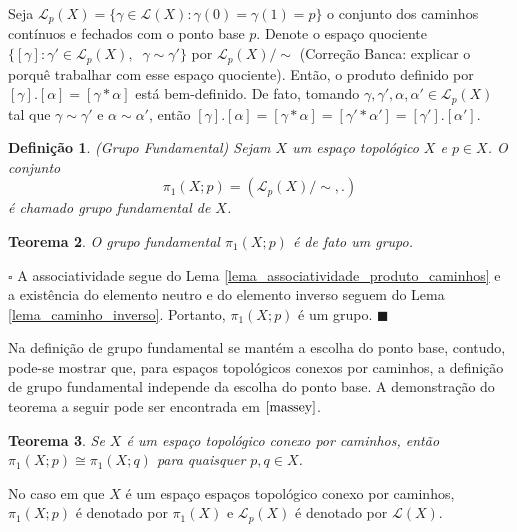 \documentclass[12pt]{book}
\newtheorem{teorema}{Teorema}[section]
\newtheorem{definicao}[teorema]{Definição}
\newenvironment{prova}[1]{$\square$ #1}{\hfill$\blacksquare$}
\newcommand{\caminhos}{\mathcal{L}}
\newcommand{\caminhospontobase}[1]{\caminhos_{#1}}
\newcommand{\caminhossempontobase}[1]{\caminhos(#1)}
\newcommand{\caminhospontobasegeral}[2]{\caminhos_{#1}(#2)}
\newcommand{\classe}[1]{[#1]}
\newcommand{\grupofundamental}[1]{\pi_{1}(#1)}
\newcommand{\grupofundamentalpontobase}[2]{\pi_{1}(#1; #2)}
\newcommand{\alerta}[1]{{\color{red}#1}}
\newcommand{\correcaobanca}[1]{\alerta{(Correção Banca: #1)}}
\begin{document}
	Seja $\caminhospontobasegeral{p}{X} = \{\gamma\in \caminhossempontobase{X}: \gamma(0)=\gamma(1)=p \}$ o conjunto dos caminhos contínuos e fechados com o ponto base $p$. Denote o espaço quociente $\{ \classe{\gamma} : \gamma' \in \caminhospontobasegeral{p}{X},\;\;\gamma \sim \gamma'\}$ por $\caminhospontobasegeral{p}{X}/\sim $ \correcaobanca{explicar o porquê trabalhar com esse espaço quociente}. Então, o produto definido por $\classe{\gamma}.\classe{\alpha} = \classe{\gamma*\alpha}$ está bem-definido. De fato, tomando $\gamma, \gamma',\alpha, \alpha' \in \caminhospontobasegeral{p}{X}$ tal que $\gamma \sim \gamma'$ e $\alpha \sim \alpha'$, então $\classe{\gamma}.\classe{\alpha} = \classe{\gamma*\alpha} = \classe{\gamma'*\alpha'} = \classe{\gamma'}.\classe{\alpha'}$.
	
	
	\begin{definicao}
		(Grupo Fundamental) Sejam $X$ um espaço topológico $X$ e $p\in X$. O conjunto
		$$
		\grupofundamentalpontobase{X}{p} = (\caminhospontobase{p}(X)/\sim, .)
		$$
		é chamado grupo fundamental de $X$.
	\end{definicao}
	
	\begin{teorema}
		O grupo fundamental $\grupofundamentalpontobase{X}{p}$ é de fato um grupo.
	\end{teorema}
	\begin{prova}
	A associatividade segue do Lema \ref{lema_associatividade_produto_caminhos} e a existência do elemento neutro e do elemento inverso  seguem do Lema \ref{lema_caminho_inverso}. Portanto, $\grupofundamentalpontobase{X}{p}$ é um grupo. 
	\end{prova}
	
	Na definição de grupo fundamental se mantém a escolha do ponto base, contudo, pode-se mostrar que, para espaços topológicos conexos por caminhos, a definição de grupo fundamental independe da escolha do ponto base. A demonstração do teorema a seguir pode ser encontrada em $\cite{massey}$.
	
	\begin{teorema}
		Se $X$ é um espaço topológico conexo por caminhos, então $\grupofundamentalpontobase{X}{p} \cong \grupofundamentalpontobase{X}{q}$ para quaisquer $p,q \in X$.
	\end{teorema}
	
	No caso em que $X$ é um espaço espaços topológico conexo por caminhos, $\grupofundamentalpontobase{X}{p}$ é denotado por $\grupofundamental{X}$ e $\caminhospontobasegeral{p}{X}$ é denotado por $\caminhossempontobase{X}$.
	
\end{document}
